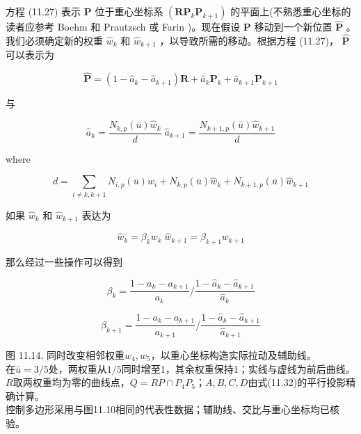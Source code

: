 \documentclass[../main.tex]{subfiles}
\begin{document}
方程 (11.27) 表示 \(\mathbf{P}\) 位于重心坐标系 \(\left( {{\mathbf{{RP}}}_{k}{\mathbf{P}}_{k + 1}}\right)\) 的平面上(不熟悉重心坐标的读者应参考 Boehm 和 Prautzsch \cite{Boeh94} 或 Farin \cite{Fari93})。现在假设 \(\mathbf{P}\) 移动到一个新位置 \(\widehat{\mathbf{P}}\) 。我们必须确定新的权重 \({\widehat{w}}_{k}\) 和 \({\widehat{w}}_{k + 1}\) ，以导致所需的移动。根据方程 (11.27)， \(\widehat{\mathbf{P}}\) 可以表示为

\[
\widehat{\mathbf{P}} = \left( {1 - {\widehat{a}}_{k} - {\widehat{a}}_{k + 1}}\right) \mathbf{R} + {\widehat{a}}_{k}{\mathbf{P}}_{k} + {\widehat{a}}_{k + 1}{\mathbf{P}}_{k + 1} \tag{11.29}
\]

与

\[
{\widehat{a}}_{k} = \frac{{N}_{k,p}\left( \bar{u}\right) {\widehat{w}}_{k}}{d}\;{\widehat{a}}_{k + 1} = \frac{{N}_{k + 1,p}\left( \bar{u}\right) {\widehat{w}}_{k + 1}}{d}
\]

where

\[
d = \mathop{\sum }\limits_{{i \neq  k,k + 1}}{N}_{i,p}\left( \bar{u}\right) {w}_{i} + {N}_{k,p}\left( \bar{u}\right) {\widehat{w}}_{k} + {N}_{k + 1,p}\left( \bar{u}\right) {\widehat{w}}_{k + 1}
\]

如果 \({\widehat{w}}_{k}\) 和 \({\widehat{w}}_{k + 1}\) 表达为

\[
{\widehat{w}}_{k} = {\beta }_{k}{w}_{k}\;{\widehat{w}}_{k + 1} = {\beta }_{k + 1}{w}_{k + 1} \tag{11.30}
\]

那么经过一些操作可以得到

\[
{\beta }_{k} = \frac{1 - {a}_{k} - {a}_{k + 1}}{{a}_{k}}/\frac{1 - {\widehat{a}}_{k} - {\widehat{a}}_{k + 1}}{{\widehat{a}}_{k}}
\]

\[
{\beta }_{k + 1} = \frac{1 - {a}_{k} - {a}_{k + 1}}{{a}_{k + 1}}/\frac{1 - {\widehat{a}}_{k} - {\widehat{a}}_{k + 1}}{{\widehat{a}}_{k + 1}} \tag{11.31}
\]

\begin{center}
\begin{minipage}{26cm}
\centering
{}
\par\smallskip
图 11.14. 同时改变相邻权重$w_4,w_5$，以重心坐标构造实际拉动及辅助线。\\
在$\bar u=3/5$处，两权重从$1/5$同时增至1，其余权重保持1；实线与虚线为前后曲线。\\
$R$取两权重均为零的曲线点，$Q=RP\cap P_4P_5$；$A,B,C,D$由式(11.32)的平行投影精确计算。\\
控制多边形采用与图11.10相同的代表性数据；辅助线、交比与重心坐标均已核验。
\end{minipage}
\end{center}
\end{document}
